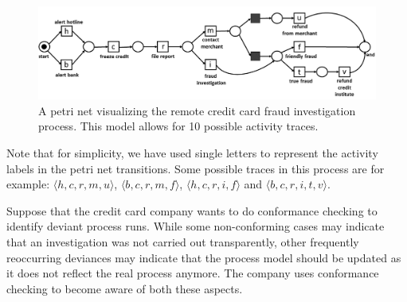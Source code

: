 \begin{figure}
	\centering
	\includegraphics[width=1\columnwidth]{figures/petrinet_cc.png}
	\caption{A petri net visualizing the remote credit card fraud investigation process. This model allows for 10 possible activity traces.}
	\label{fig: petrinet}
\end{figure}

Note that for simplicity, we have used single letters to represent the activity labels in the petri net transitions.
Some possible traces in this process are for example:
$\langle h,c,r,m,u \rangle$,
$\langle b,c,r,m,f \rangle$,
$\langle h,c,r,i,f \rangle$ and
$\langle b,c,r,i,t,v \rangle$.

Suppose that the credit card company wants to do conformance checking to identify deviant process runs.
While some non-conforming cases may indicate that an investigation was not carried out transparently, other frequently reoccurring deviances may indicate that the process model should be updated as it does not reflect the real process anymore.
The company uses conformance checking to become aware of both these aspects.

